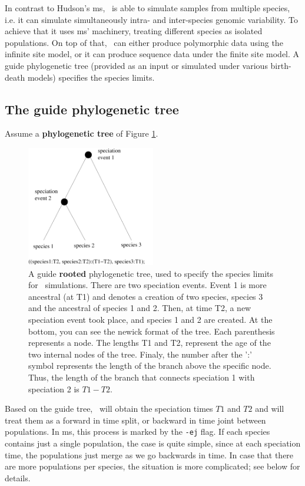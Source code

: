 In contrast to Hudson's ms, \comus\  is able to simulate samples from multiple species, i.e. it can simulate simultaneously intra- and inter-species genomic variability. To achieve that it uses ms' machinery, treating different species as isolated populations. On top of that, \comus\ can either produce polymorphic data using the infinite site model, or it can produce sequence data under the finite site model. A guide phylogenetic tree (provided as an input or simulated under various birth-death models) specifies the species limits.

\subsection{ The guide phylogenetic tree }

Assume a {\bf phylogenetic tree } of Figure \ref{fig:1}.


\begin{figure}[htbp!]
\includegraphics[width=0.5\textwidth]{guideTree.pdf}
\caption{A guide {\bf rooted} phylogenetic tree, used to specify the species limits for \comus\ simulations. There are two speciation events. Event 1 is more ancestral (at T1) and denotes a creation of two species, species 3 and the ancestral of species 1 and 2. Then, at time T2, a new speciation event took place, and species 1 and 2 are created. At the bottom, you can see the newick format of the tree. Each parenthesis represents a node. The lengths T1 and T2, represent the age of the two internal nodes of the tree. Finaly, the number after the ':' symbol represents the length of the branch above the specific node. Thus, the length of the branch that connects speciation 1 with speciation 2 is $T1 - T2$. }
\label{fig:1}

\end{figure}

Based on the guide tree, \comus\ will obtain the speciation times $T1$ and $T2$ and will treat them as a forward in time split, or backward in time joint between populations. In ms, this process is marked by the \verb!-ej! flag. If each species contains just a single population, the case is quite simple, since at each speciation time, the populations just merge as we go backwards in time. In case that there are more populations per species, the situation is more complicated; see below for details. 


